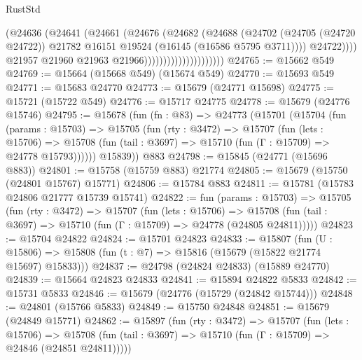 \begin{lexlean}{RustStd}
\begin{coremodule}
                                            (@24636
                                              (@24641
                                                (@24661
                                                  (@24676
                                                    (@24682
                                                      (@24688
                                                        (@24702
                                                          (@24705 (@24720 @24722))
                                                          @21782
                                                          @16151
                                                          @19524
                                                          (@16145 (@16586 @5795 @3711))))
                                                      @24722))))
                                              @21957
                                              @21960
                                              @21963
                                              @21966)))))))))))))))))))))
@24765 := @15662 @549
@24769 := @15664 (@15668 @549) (@15674 @549)
@24770 := @15693 @549
@24771 := @15683 @24770
@24773 := @15679 (@24771 @15698)
@24775 := @15721 (@15722 @549)
@24776 := @15717 @24775
@24778 := @15679 (@24776 @15746)
@24795 := @15678
    (fun (fn : @83) =>
    @24773
      (@15701
        (@15704
          (fun (params : @15703) =>
          @15705
            (fun (rty : @3472) =>
            @15707
              (fun (lets : @15706) =>
              @15708 (fun (tail : @3697) => @15710 (fun (Γ : @15709) => @24778 @15793))))))
        @15839))
    @883
@24798 := @15845 (@24771 (@15696 @883))
@24801 := @15758 (@15759 @883) @21774
@24805 := @15679 (@15750 (@24801 @15767) @15771)
@24806 := @15784 @883
@24811 := @15781 (@15783 @24806 @21777 @15739 @15741)
@24822 := fun (params : @15703) =>
  @15705
    (fun (rty : @3472) =>
    @15707
      (fun (lets : @15706) =>
      @15708 (fun (tail : @3697) => @15710 (fun (Γ : @15709) => @24778 (@24805 @24811)))))
@24823 := @15704 @24822
@24824 := @15701 @24823
@24833 := @15807
    (fun (U : @15806) => @15808 (fun (t : @7) => @15816 (@15679 (@15822 @21774 @15697) @15833)))
@24837 := @24798 (@24824 @24833) (@15889 @24770)
@24839 := @15664 @24823 @24833
@24841 := @15894 @24822 @5833
@24842 := @15731 @5833
@24846 := @15679 (@24776 (@15729 (@24842 @15744)))
@24848 := @24801 (@15766 @5833)
@24849 := @15750 @24848
@24851 := @15679 (@24849 @15771)
@24862 := @15897
    (fun (rty : @3472) =>
    @15707
      (fun (lets : @15706) =>
      @15708 (fun (tail : @3697) => @15710 (fun (Γ : @15709) => @24846 (@24851 @24811)))))

\end{coremodule}
\end{lexlean}
